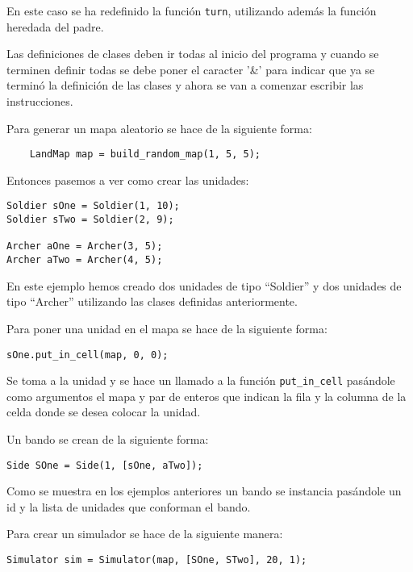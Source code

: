 En este caso se ha redefinido la funci\'on \verb|turn|, utilizando adem\'as la funci\'on heredada del padre.

Las definiciones de clases deben ir todas al inicio del programa y cuando se terminen definir todas se debe poner el caracter '\&' para indicar que ya se termin\'o la definici\'on de las clases y ahora se van a comenzar escribir las instrucciones.

Para generar un mapa aleatorio se hace de la siguiente forma:

\begin{verbatim}
	LandMap map = build_random_map(1, 5, 5);
\end{verbatim} 

Entonces pasemos a ver como crear las unidades:

\begin{verbatim}
Soldier sOne = Soldier(1, 10);
Soldier sTwo = Soldier(2, 9);
	
Archer aOne = Archer(3, 5);
Archer aTwo = Archer(4, 5);	
\end{verbatim}  

En este ejemplo hemos creado dos unidades de tipo ``Soldier'' y dos unidades de tipo ``Archer'' utilizando las clases definidas anteriormente.

Para poner una unidad en el mapa se hace de la siguiente forma:

\begin{verbatim}
sOne.put_in_cell(map, 0, 0);
\end{verbatim}

Se toma a la unidad y se hace un llamado a la funci\'on \verb|put_in_cell| pas\'andole como argumentos el mapa y par de enteros que indican la fila y la columna de la celda donde se desea colocar la unidad.

Un bando se crean de la siguiente forma:
  
\begin{verbatim}
Side SOne = Side(1, [sOne, aTwo]);
\end{verbatim}

Como se muestra en los ejemplos anteriores un bando se instancia pas\'andole un id y la lista de unidades que conforman el bando.

Para crear un simulador se hace de la siguiente manera:

\begin{verbatim}
Simulator sim = Simulator(map, [SOne, STwo], 20, 1);
\end{verbatim}

